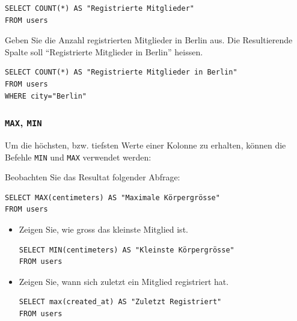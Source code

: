 \begin{lstlisting}[style=sql]
SELECT COUNT(*) AS "Registrierte Mitglieder" 
FROM users
\end{lstlisting}

\begin{aufgabe}{}
Geben Sie die Anzahl registrierten Mitglieder in Berlin aus. Die Resultierende Spalte soll ``Registrierte Mitglieder in Berlin'' heissen.
\begin{myantwort}
\begin{lstlisting}[style=sql]
SELECT COUNT(*) AS "Registrierte Mitglieder in Berlin" 
FROM users
WHERE city="Berlin"
\end{lstlisting}
\end{myantwort}
\end{aufgabe}

\subsubsection{\lstinline[style=sql]|MAX|, \lstinline[style=sql]|MIN|}

Um die höchsten, bzw. tiefsten Werte einer Kolonne zu erhalten, können die Befehle \lstinline[style=sql]|MIN| und \lstinline[style=sql]|MAX| verwendet werden:

\begin{myexample}
Beobachten Sie das Resultat folgender Abfrage:

\begin{lstlisting}[style=sql]
SELECT MAX(centimeters) AS "Maximale Körpergrösse" 
FROM users
\end{lstlisting}
\end{myexample}

\begin{aufgabe}{}
\begin{itemize}
\item Zeigen Sie, wie gross das kleinste Mitglied ist.
\begin{myantwort}
\begin{lstlisting}[style=sql]
SELECT MIN(centimeters) AS "Kleinste Körpergrösse"
FROM users
\end{lstlisting}
\end{myantwort}
\item Zeigen Sie, wann sich zuletzt ein Mitglied registriert hat.
\begin{myantwort}
\begin{lstlisting}[style=sql]
SELECT max(created_at) AS "Zuletzt Registriert"
FROM users
\end{lstlisting}
\end{myantwort}
\end{itemize}
\end{aufgabe}


